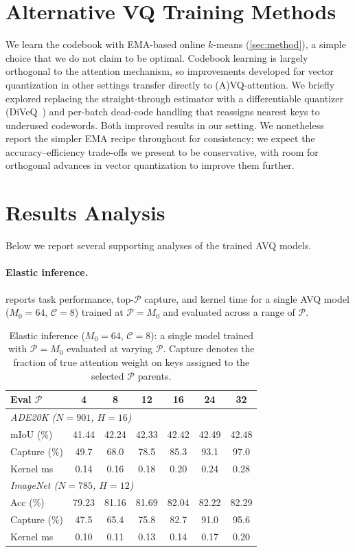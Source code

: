 \section{Alternative VQ Training Methods}
\label{app:alt_training}
We learn the codebook with EMA-based online $k$-means (\cref{sec:method}), a simple choice that we do not claim to be optimal. Codebook learning is largely orthogonal to the attention mechanism, so improvements developed for vector quantization in other settings transfer directly to (A)VQ-attention. We briefly explored replacing the straight-through estimator with a differentiable quantizer (DiVeQ~\cite{vali2026diveq}) and per-batch dead-code handling that reassigns nearest keys to underused codewords. Both improved results in our setting. We nonetheless report the simpler EMA recipe throughout for consistency; we expect the accuracy--efficiency trade-offs we present to be conservative, with room for orthogonal advances in vector quantization to improve them further. 

\section{Results Analysis}
\label{app:results_analysis}

Below we report several supporting analyses of the trained AVQ models.

\paragraph{Elastic inference.}  reports task performance, top-$\mathcal{P}$ capture, and kernel time for a single AVQ model ($M_0{=}64$, $\mathcal{C}{=}8$) trained at $\mathcal{P}{=}M_0$ and evaluated across a range of $\mathcal{P}$.

\begin{table}[t]
\centering
\caption{Elastic inference ($M_0{=}64$, $\mathcal{C}{=}8$): a single model trained with $\mathcal{P}{=}M_0$ evaluated at varying $\mathcal{P}$. Capture denotes the fraction of true attention weight on keys assigned to the selected $\mathcal{P}$ parents.}
\label{tab:elastic_p}
\begin{tabular}{lcccccc}
\toprule
Eval $\mathcal{P}$ & 4 & 8 & 12 & 16 & 24 & 32 \\
\midrule
\multicolumn{7}{l}{\textit{ADE20K ($N{=}901$, $H{=}16$)}} \\
mIoU (\%)    & 41.44 & 42.24 & 42.33 & 42.42 & 42.49 & 42.48 \\
Capture (\%) & 49.7  & 68.0  & 78.5  & 85.3  & 93.1  & 97.0  \\
Kernel ms    & 0.14  & 0.16  & 0.18  & 0.20  & 0.24  & 0.28  \\
\midrule
\multicolumn{7}{l}{\textit{ImageNet ($N{=}785$, $H{=}12$)}} \\
Acc (\%)     & 79.23 & 81.16 & 81.69 & 82.04 & 82.22 & 82.29 \\
Capture (\%) & 47.5  & 65.4  & 75.8  & 82.7  & 91.0  & 95.6  \\
Kernel ms    & 0.10  & 0.11  & 0.13  & 0.14  & 0.17  & 0.20  \\
\bottomrule
\end{tabular}
\end{table}

